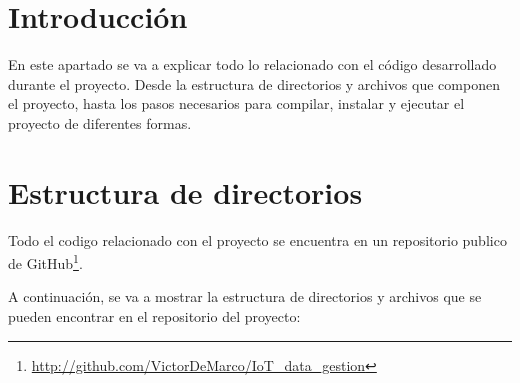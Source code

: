 
\section{Introducción}
En este apartado se va a explicar todo lo relacionado con el código desarrollado durante el proyecto. Desde la estructura de directorios y archivos que componen el proyecto, hasta los pasos necesarios para  compilar, instalar y ejecutar el proyecto de diferentes formas.
\section{Estructura de directorios}
Todo el codigo relacionado con el proyecto se encuentra en un repositorio publico de
GitHub\footnote{\href{http://github.com/VictorDeMarco/IoT_data_gestion}{http://github.com/VictorDeMarco/IoT\_data\_gestion}}. 

A continuación, se va a mostrar la estructura de directorios y archivos que se pueden encontrar en el repositorio del proyecto:


